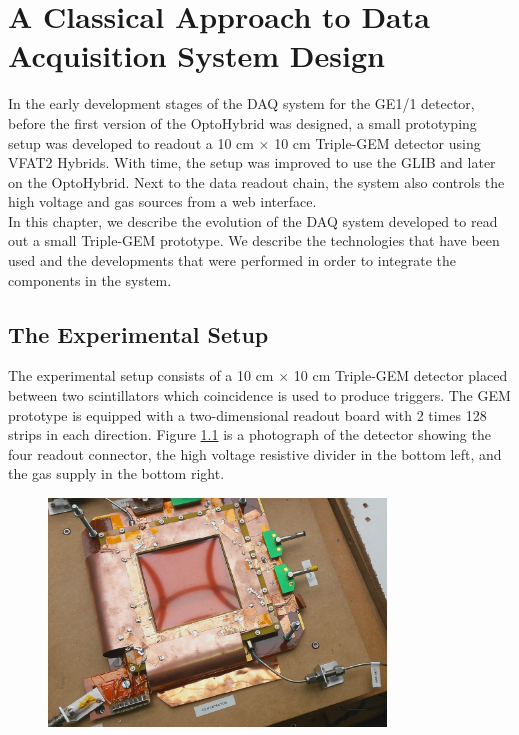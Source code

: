 \chapter{A Classical Approach to Data Acquisition System Design}
\label{chap:III-1-arch}

  In the early development stages of the DAQ system for the GE1/1 detector, before the first version of the OptoHybrid was designed, a small prototyping setup was developed to readout a 10 cm $ \times $ 10 cm Triple-GEM detector using VFAT2 Hybrids. With time, the setup was improved to use the GLIB and later on the OptoHybrid. Next to the data readout chain, the system also controls the high voltage and gas sources from a web interface. \\

  In this chapter, we describe the evolution of the DAQ system developed to read out a small Triple-GEM prototype. We describe the technologies that have been used and the developments that were performed in order to integrate the components in the system.

  \section{The Experimental Setup}

    The experimental setup consists of a 10 cm $ \times $ 10 cm Triple-GEM detector placed between two scintillators which coincidence is used to produce triggers. The GEM prototype is equipped with a two-dimensional readout board with 2 times 128 strips in each direction. Figure \ref{fig:III-1-gem} is a photograph of the detector showing the four readout connector, the high voltage resistive divider in the bottom left, and the gas supply in the bottom right. \\

    \begin{figure}[h!]
      \centering
      \includegraphics[width=0.8\textwidth]{img/III-1-arch/gem.png}
      \caption{}
      \label{fig:III-1-gem}
    \end{figure}

